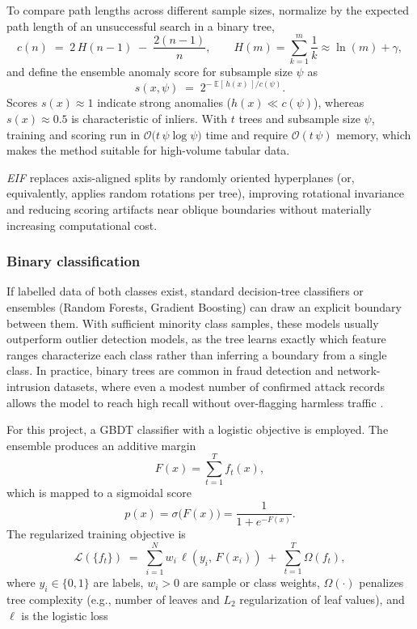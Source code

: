 To compare path lengths across different sample sizes, \textcite{inproceedings} normalize by the expected path length of an unsuccessful search in a binary tree,
\begin{equation}
c(n)\;=\;2\,H(n-1)\;-\;\frac{2(n-1)}{n},
\qquad
H(m)=\sum_{k=1}^{m}\frac{1}{k}\approx \ln(m)+\gamma,
\label{eq:expected-path-length}
\end{equation}
and define the ensemble anomaly score for subsample size $\psi$ as
\begin{equation}
s(x,\psi)\;=\;2^{-\; \mathbb{E}[\,h(x)\,]/c(\psi)}.
\label{eq:isolation-forest-score}
\end{equation}
Scores $s(x)\approx 1$ indicate strong anomalies ($h(x)\ll c(\psi)$), whereas $s(x)\approx 0.5$ is characteristic of inliers. With $t$ trees and subsample size $\psi$, training and scoring run in $\mathcal{O}\big(t\,\psi\log\psi\big)$ time and require $\mathcal{O}(t\,\psi)$ memory, which makes the method suitable for high-volume tabular data.\autocite{inproceedings}

\emph{\ac{EIF}} replaces axis-aligned splits by randomly oriented hyperplanes (or, equivalently, applies random rotations per tree), improving rotational invariance and reducing scoring artifacts near oblique boundaries without materially increasing computational cost.\autocite{haririExtendedIsolationForest2019}

\subsubsection{Binary classification}

If labelled data of both classes exist, standard decision-tree classifiers or ensembles (Random Forests, Gradient Boosting) can draw an explicit boundary between them. With sufficient minority class samples, these models usually outperform outlier detection models, as the tree learns exactly which feature ranges characterize each class rather than inferring a boundary from a single class. In practice, binary trees are common in fraud detection and network-intrusion datasets, where even a modest number of confirmed attack records allows the model to reach high recall without over-flagging harmless traffic \autocite{354051491,binary-classification-for-fraud-detection}.

For this project, a \ac{GBDT} classifier with a logistic objective is employed. The ensemble produces an additive margin
\[
F(x)=\sum_{t=1}^{T} f_t(x),
\]
which is mapped to a sigmoidal score
\begin{equation}
p(x)=\sigma\big(F(x)\big)=\frac{1}{1+e^{-F(x)}}.
\label{eq:gbdt-sigmoid}
\end{equation}
The regularized training objective is
\begin{equation}
\mathcal{L}(\{f_t\}) \;=\; \sum_{i=1}^{N} w_i\,\ell\!\left(y_i,\,F(x_i)\right) \;+\; \sum_{t=1}^{T} \Omega\!\left(f_t\right),
\label{eq:gbdt-objective}
\end{equation}
where \(y_i\in\{0,1\}\) are labels, \(w_i>0\) are sample or class weights, \(\Omega(\cdot)\) penalizes tree complexity (e.g., number of leaves and \(L_2\) regularization of leaf values), and \(\ell\) is the logistic loss

